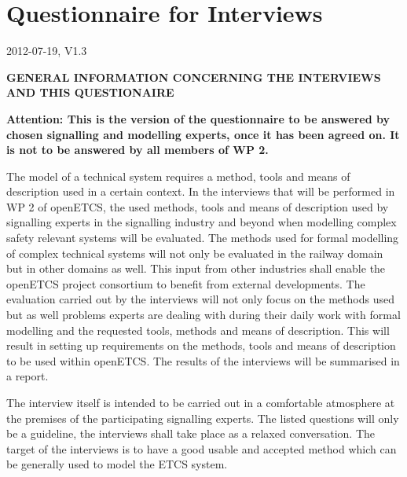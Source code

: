 \documentclass{./template/openetcs_report}
\begin{document}
\appendix

\chapter{Questionnaire for Interviews}
\label{chap: questionnaire}

2012-07-19, V1.3 

\textbf{\Large GENERAL INFORMATION CONCERNING THE INTERVIEWS AND THIS QUESTIONAIRE}

\textbf {Attention: This is the version of the questionnaire to be answered by chosen signalling and modelling experts, once it has been agreed on. It is not to be answered by all members of WP 2.}

The model of a technical system requires a method, tools and means of description used in a certain context. In the interviews that will be performed in WP 2 of openETCS, the used methods, tools and means of description used by signalling experts in the signalling industry and beyond when modelling complex safety relevant systems will be evaluated. The methods used for formal modelling of complex technical systems will not only be evaluated in the railway domain but in other domains as well. This input from other industries shall enable the openETCS project consortium to benefit from external developments.
The evaluation carried out by the interviews will not only focus on the methods used but as well problems experts are dealing with during their daily work with formal modelling and the requested tools, methods and means of description. This will result in setting up requirements on the methods, tools and means of description to be used within openETCS. The results of the interviews will be summarised in a report.


The interview itself is intended to be carried out in a comfortable atmosphere at the premises of the participating signalling experts. The listed questions will only be a guideline, the interviews shall take place as a relaxed conversation. The target of the interviews is to have a good usable and accepted method which can be generally used to model the ETCS system.\newpage
\end{document}
